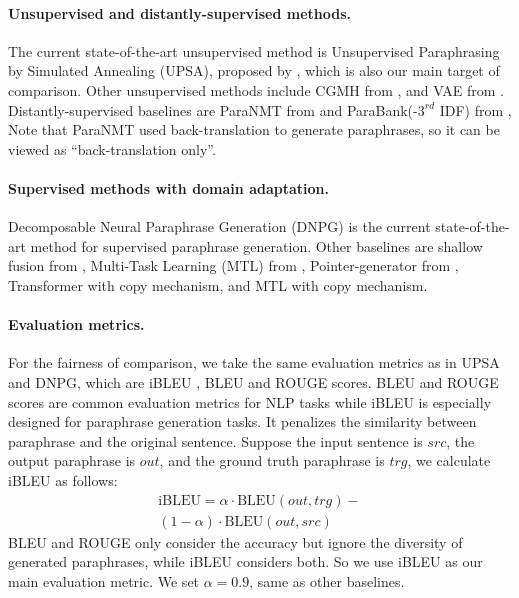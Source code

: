 \paragraph{Unsupervised and distantly-supervised methods. } The current state-of-the-art unsupervised method is Unsupervised Paraphrasing by Simulated Annealing (UPSA), proposed by \citet{liu2019unsupervised}, which is also our main target of comparison. Other unsupervised methods include CGMH from \citet{miao2019cgmh}, and VAE from \citet{kingma2013auto}. Distantly-supervised baselines are ParaNMT from \citet{wieting2017paranmt} and ParaBank(-$3^{rd}$ IDF) from \citet{hu2019parabank}, Note that ParaNMT used back-translation to generate paraphrases, so it can be viewed as ``back-translation only''.

\paragraph{Supervised methods with domain adaptation. } Decomposable Neural Paraphrase Generation (DNPG) \citep{li2019decomposable} is the current state-of-the-art method for supervised paraphrase generation.
Other baselines are shallow fusion from \citet{gulcehre2015using}, Multi-Task Learning (MTL) from \citet{domhan2017using}, Pointer-generator from \citet{see2017get}, Transformer \citep{vaswani2017attention} with copy mechanism, and MTL with copy mechanism. 

\paragraph{Evaluation metrics. } For the fairness of comparison, 
we take the same evaluation metrics as in UPSA and 
DNPG, which are iBLEU \citep{sun2012joint}, BLEU \citep{papineni2002bleu} and ROUGE \citep{lin2004rouge} scores. 
BLEU and ROUGE scores are common evaluation metrics for NLP tasks while 
iBLEU is especially designed for paraphrase generation tasks. 
It penalizes the similarity between paraphrase and the original sentence. 
Suppose the input sentence is $src$, the output paraphrase is $out$, 
and the ground truth paraphrase is $trg$, we calculate iBLEU as follows:
\begin{multline}
\text{iBLEU} = \alpha \cdot \text{BLEU}(out, trg) - \\
(1-\alpha) \cdot \text{BLEU}(out, src)
\label{equ:ibleu}
\end{multline}
BLEU and ROUGE only consider the accuracy but ignore the 
diversity of generated paraphrases, while iBLEU considers both. 
So we use iBLEU as our main evaluation metric.
We set $\alpha=0.9$, same as other baselines.

